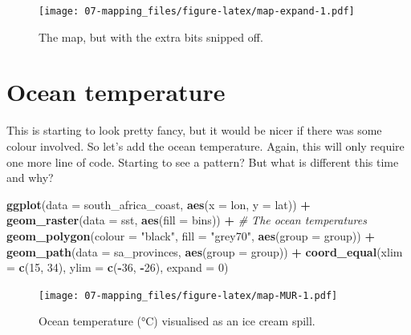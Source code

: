 \documentclass[]{book}
\newenvironment{Shaded}{\begin{snugshade}}{\end{snugshade}}
\newcommand{\KeywordTok}[1]{\textcolor[rgb]{0.13,0.29,0.53}{\textbf{#1}}}
\newcommand{\DataTypeTok}[1]{\textcolor[rgb]{0.13,0.29,0.53}{#1}}
\newcommand{\DecValTok}[1]{\textcolor[rgb]{0.00,0.00,0.81}{#1}}
\newcommand{\StringTok}[1]{\textcolor[rgb]{0.31,0.60,0.02}{#1}}
\newcommand{\CommentTok}[1]{\textcolor[rgb]{0.56,0.35,0.01}{\textit{#1}}}
\newcommand{\OperatorTok}[1]{\textcolor[rgb]{0.81,0.36,0.00}{\textbf{#1}}}
\newcommand{\NormalTok}[1]{#1}
\theoremstyle{definition}
\theoremstyle{definition}
\theoremstyle{definition}
\theoremstyle{remark}
\begin{document}
\begin{figure}
\centering
\texttt{[image: 07-mapping\_files/figure-latex/map-expand-1.pdf]}
\caption{\label{fig:map-expand}The map, but with the extra bits snipped
off.}
\end{figure}

\section{Ocean temperature}\label{ocean-temperature}

This is starting to look pretty fancy, but it would be nicer if there
was some colour involved. So let's add the ocean temperature. Again,
this will only require one more line of code. Starting to see a pattern?
But what is different this time and why?

\begin{Shaded}
\begin{Highlighting}[]
\KeywordTok{ggplot}\NormalTok{(}\DataTypeTok{data =}\NormalTok{ south_africa_coast, }\KeywordTok{aes}\NormalTok{(}\DataTypeTok{x =}\NormalTok{ lon, }\DataTypeTok{y =}\NormalTok{ lat)) }\OperatorTok{+}
\StringTok{  }\KeywordTok{geom_raster}\NormalTok{(}\DataTypeTok{data =}\NormalTok{ sst, }\KeywordTok{aes}\NormalTok{(}\DataTypeTok{fill =}\NormalTok{ bins)) }\OperatorTok{+}\StringTok{ }\CommentTok{# The ocean temperatures}
\StringTok{  }\KeywordTok{geom_polygon}\NormalTok{(}\DataTypeTok{colour =} \StringTok{"black"}\NormalTok{, }\DataTypeTok{fill =} \StringTok{"grey70"}\NormalTok{, }\KeywordTok{aes}\NormalTok{(}\DataTypeTok{group =}\NormalTok{ group)) }\OperatorTok{+}
\StringTok{  }\KeywordTok{geom_path}\NormalTok{(}\DataTypeTok{data =}\NormalTok{ sa_provinces, }\KeywordTok{aes}\NormalTok{(}\DataTypeTok{group =}\NormalTok{ group)) }\OperatorTok{+}
\StringTok{  }\KeywordTok{coord_equal}\NormalTok{(}\DataTypeTok{xlim =} \KeywordTok{c}\NormalTok{(}\DecValTok{15}\NormalTok{, }\DecValTok{34}\NormalTok{), }\DataTypeTok{ylim =} \KeywordTok{c}\NormalTok{(}\OperatorTok{-}\DecValTok{36}\NormalTok{, }\OperatorTok{-}\DecValTok{26}\NormalTok{), }\DataTypeTok{expand =} \DecValTok{0}\NormalTok{)}
\end{Highlighting}
\end{Shaded}

\begin{figure}
\centering
\texttt{[image: 07-mapping\_files/figure-latex/map-MUR-1.pdf]}
\caption{\label{fig:map-MUR}Ocean temperature (°C) visualised as an ice
cream spill.}
\end{figure}
\end{document}
